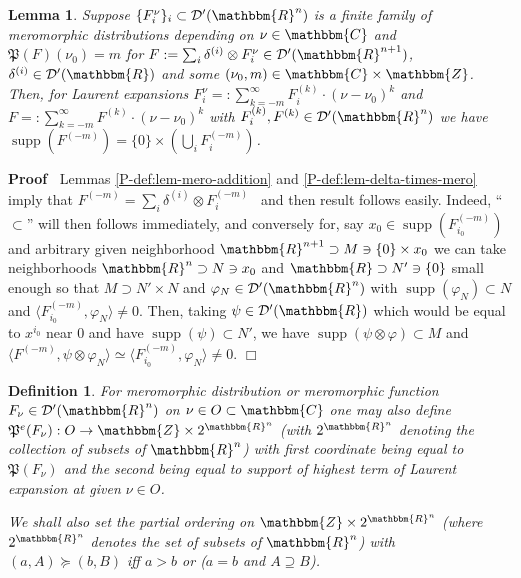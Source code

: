 \documentclass{article}
\newcommand{\nobracket}{}
\newcommand{\assign}{:=}
\newcommand{\tmop}[1]{\ensuremath{\operatorname{#1}}}
\renewenvironment{proof}{\noindent\textbf{Proof\ }}{\hspace*{\fill}$\Box$\medskip}
\newtheorem{definition}[proposition]{Definition}
\newtheorem{lemma}[proposition]{Lemma}
\theoremstyle{remark}
\begin{document}
\begin{lemma}
  \label{P-def:lem-mero-supp}Suppose $\{ F_i^{\nu} \}_i \subset \mathcal{D}'
  (\mathbbm{R}^n)$ is a finite family of meromorphic distributions depending
  on $\nu \in \mathbbm{C}$ and $\mathfrak{P} (F) (\nu_0) = m$ for $F \assign
  \sum_i \delta^{(i)} \otimes F_i^{\nu} \in \mathcal{D}' (\mathbbm{R}^{n +
  1})$, $\delta^{(i)} \in \mathcal{D}' (\mathbbm{R})$ and some $(\nu_0, m) \in
  \mathbbm{C} \nobracket \times \mathbbm{Z} \nobracket$. Then, for Laurent
  expansions $F_i^{\nu} = : \sum_{k = - m}^{\infty} F_i^{(k)} \cdot (\nu -
  \nu_0)^k$ and $F = : \sum_{k = - m}^{\infty} F^{(k)} \cdot (\nu - \nu_0)^k$
  with $F_i^{(k)}, F^{(k)} \in \mathcal{D}' (\mathbbm{R}^n)$ we have
  $\tmop{supp} (F^{(- m)}) = \{ 0 \} \times \left( \bigcup_i F_i^{(- m)}
  \right)^{}$.
\end{lemma}

\begin{proof}
  Lemmas \ref{P-def:lem-mero-addition} and \ref{P-def:lem-delta-times-mero}
  imply that $F^{(- m)} = \sum_i \delta^{(i)} \otimes F_i^{(- m)}$ \ and then
  result follows easily. Indeed, ``$\subset$'' will then follows immediately,
  and conversely for, say $x_0 \in \tmop{supp} (F_{i_0}^{(- m)})$ and
  arbitrary given neighborhood $\mathbbm{R}^{n + 1} \supset M \ni \{ 0 \}
  \times x_0$ we can take neighborhoods $\mathbbm{R}^n \supset N \ni x_0$ and
  $\mathbbm{R} \supset N' \ni \{ 0 \}$ small enough so that $M \supset N'
  \times N$ and $\varphi_N \in \mathcal{D}' (\mathbbm{R}^n)$ with $\tmop{supp}
  (\varphi_N) \subset N$ and $\langle F_{i_0}^{(- m)}, \varphi_N \rangle \neq
  0$. Then, taking $\psi \in \mathcal{D}' (\mathbbm{R})$ which would be equal
  to $x^{i_0}$ near 0 and have $\tmop{supp} (\psi) \subset N'$, we have
  $\tmop{supp} (\psi \otimes \varphi) \subset M$ and $\langle F^{(- m)}, \psi
  \otimes \varphi_N \rangle \simeq \langle F_{i_0}^{(- m)}, \varphi_N \rangle
  \neq 0$.
\end{proof}

\begin{definition}
  \label{P-def:def-9}For meromorphic distribution or meromorphic function
  $F_{\nu} \in \mathcal{D}' (\mathbbm{R}^n)$ on $\nu \in O \subset
  \mathbbm{C}$ one may also define $\mathfrak{P}^e (F_{\nu}) : O \rightarrow
  \mathbbm{Z} \times 2^{\mathbbm{R}^n}$ (with $2^{\mathbbm{R}^n}$ denoting the
  collection of subsets of $\mathbbm{R}^n$) with first coordinate being equal
  to $\mathfrak{P} (F_{\nu})$ and the second being equal to support of highest
  term of Laurent expansion at given $\nu \in O$.
  
  We shall also set the partial ordering on $\mathbbm{Z} \times
  2^{\mathbbm{R}^n}$ (where $2^{\mathbbm{R}^n}$ denotes the set of subsets of
  $\mathbbm{R}^n$) with $(a, A) \succcurlyeq (b, B)$ iff $a > b$ or ($a = b$
  and $A \supseteq B$).
\end{definition}
\end{document}
